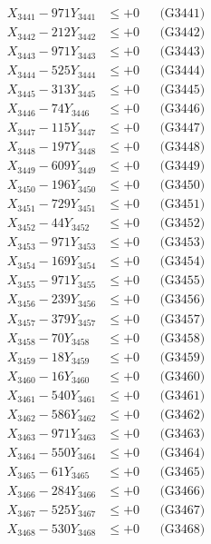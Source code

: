 \documentclass[a4paper,10pt]{article}
\begin{document}
{\begin{align}
\allowbreak
X_{3441} - 971Y_{3441} &\leq +0 && \text{(G3441)} \\
X_{3442} - 212Y_{3442} &\leq +0 && \text{(G3442)} \\
X_{3443} - 971Y_{3443} &\leq +0 && \text{(G3443)} \\
X_{3444} - 525Y_{3444} &\leq +0 && \text{(G3444)} \\
X_{3445} - 313Y_{3445} &\leq +0 && \text{(G3445)} \\
X_{3446} - 74Y_{3446} &\leq +0 && \text{(G3446)} \\
X_{3447} - 115Y_{3447} &\leq +0 && \text{(G3447)} \\
X_{3448} - 197Y_{3448} &\leq +0 && \text{(G3448)} \\
X_{3449} - 609Y_{3449} &\leq +0 && \text{(G3449)} \\
X_{3450} - 196Y_{3450} &\leq +0 && \text{(G3450)} \\
\allowbreak
X_{3451} - 729Y_{3451} &\leq +0 && \text{(G3451)} \\
X_{3452} - 44Y_{3452} &\leq +0 && \text{(G3452)} \\
X_{3453} - 971Y_{3453} &\leq +0 && \text{(G3453)} \\
X_{3454} - 169Y_{3454} &\leq +0 && \text{(G3454)} \\
X_{3455} - 971Y_{3455} &\leq +0 && \text{(G3455)} \\
X_{3456} - 239Y_{3456} &\leq +0 && \text{(G3456)} \\
X_{3457} - 379Y_{3457} &\leq +0 && \text{(G3457)} \\
X_{3458} - 70Y_{3458} &\leq +0 && \text{(G3458)} \\
X_{3459} - 18Y_{3459} &\leq +0 && \text{(G3459)} \\
X_{3460} - 16Y_{3460} &\leq +0 && \text{(G3460)} \\
\allowbreak
X_{3461} - 540Y_{3461} &\leq +0 && \text{(G3461)} \\
X_{3462} - 586Y_{3462} &\leq +0 && \text{(G3462)} \\
X_{3463} - 971Y_{3463} &\leq +0 && \text{(G3463)} \\
X_{3464} - 550Y_{3464} &\leq +0 && \text{(G3464)} \\
X_{3465} - 61Y_{3465} &\leq +0 && \text{(G3465)} \\
X_{3466} - 284Y_{3466} &\leq +0 && \text{(G3466)} \\
X_{3467} - 525Y_{3467} &\leq +0 && \text{(G3467)} \\
X_{3468} - 530Y_{3468} &\leq +0 && \text{(G3468)} \\

\end{align}}
\end{document}

